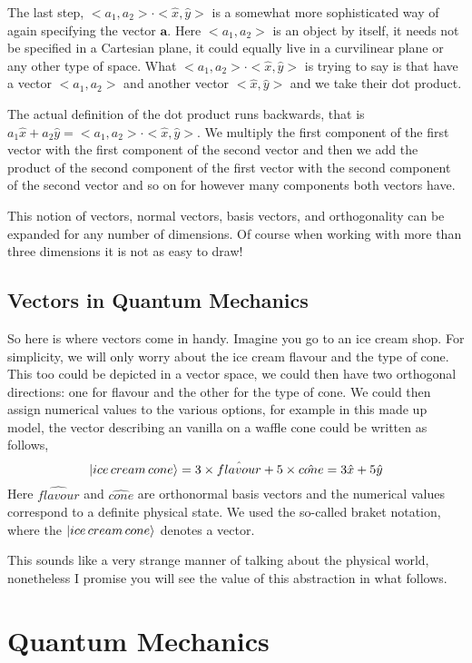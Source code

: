\documentclass[a4paper]{article}
\begin{document}
The last step, $ < a_1, a_2 > \cdot < \hat{x} , \hat{y} > $ is a somewhat more sophisticated way of again specifying the vector $\boldsymbol{a}$. 
Here $ < a_1, a_2 >$ is an object by itself, it needs not be specified in a Cartesian plane, it could equally live in a curvilinear plane or any other type of space.
What $ < a_1, a_2 > \cdot < \hat{x} , \hat{y} > $ is trying to say is that have a vector $ < a_1, a_2 >$ and another vector $ < \hat{x} , \hat{y} > $ and we take their dot product.

The actual definition of the dot product runs backwards, that is $a_1 \hat{x} + a_2 \hat{y} = < a_1, a_2 > \cdot < \hat{x} , \hat{y} >$. We multiply the first component of the first vector with the first component of the second vector and then we add the product of the second component of the first vector with the second component of the second vector and so on for however many components both vectors have.

This notion of vectors, normal vectors, basis vectors, and orthogonality can be expanded for any number of dimensions. 
Of course when working with more than three dimensions it is not as easy to draw!

\subsection{Vectors in Quantum Mechanics}
So here is where vectors come in handy.
Imagine you go to an ice cream shop. 
For simplicity, we will only worry about the ice cream flavour and the type of cone.
This too could be depicted in a vector space, we could then have two orthogonal directions: one for flavour and the other for the type of cone. 
We could then assign numerical values to the various options, for example in this made up model, the vector describing an vanilla on a waffle cone could be written as follows,
$$
\ket{ice \, cream \, cone} = 3\times\hat{flavour} + 5\times \hat{cone} = 3 \hat{x} + 5 \hat{y}
$$
Here $\hat{flavour}$ and $\hat{cone}$ are orthonormal basis vectors and the numerical values correspond to a definite physical state. 
We used the so-called braket notation, where the $\ket{ice \, cream \, cone}$ denotes a vector.

This sounds like a very strange manner of talking about the physical world, nonetheless I promise you will see the value of this abstraction in what follows.



\section{Quantum Mechanics}
\end{document}
